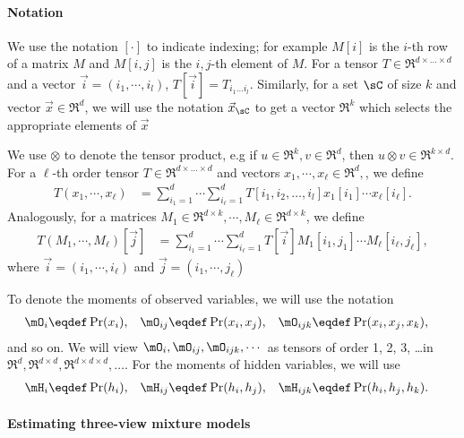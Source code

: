 \paragraph{Notation}

We use the notation $[\cdot]$ to indicate indexing; for example $M[i]$
  is the $i$-th row of a matrix $M$ and $M[i,j]$ is the $i,j$-th element
  of $M$.
For a tensor $T \in \Re^{d \times \ldots \times d}$ and a vector $\vec
  i = (i_1, \cdots, i_l)$, $T[\vec i] = T_{i_1 \ldots i_l}$.
Similarly, for a set $\sC$ of size $k$ and vector $\vec x \in \Re^d$, we
  will use the notation $\vec x_\sC$ to get a vector $\Re^k$ which selects
  the appropriate elements of $\vec x$

We use $\otimes$ to denote the tensor product, e.g if $u \in \Re^k,
  v \in \Re^d$, then $u \otimes v \in \Re^{k \times d}$.
For a $\ell$-th order tensor $T \in \Re^{d \times \ldots \times
  d}$ and vectors $x_1, \cdots, x_\ell \in \Re^{d},$, we define 
\begin{align*}
  T(x_1, \cdots, x_\ell) 
      &= \sum_{i_1 = 1}^{d} \cdots \sum_{i_\ell = 1}^{d} 
            T[i_1, i_2, \ldots, i_l] x_1[i_1] \cdots x_\ell[i_\ell].
\end{align*}
Analogously, for a matrices $M_1 \in \Re^{d \times k}, \cdots,
  M_\ell \in \Re^{d \times k}$, we define
\begin{align*}
  T(M_1, \cdots, M_\ell)[\vec j]
      &= \sum_{i_1 = 1}^{d} \cdots \sum_{i_\ell = 1}^{d} 
            T[\vec i] {M_1}[i_1,j_1] \cdots M_\ell[i_\ell, j_\ell],
\end{align*}
where $\vec i = (i_1, \cdots, i_\ell)$ and $\vec j = (i_1, \cdots, j_\ell)$

To denote the moments of observed variables, we will use the notation
\begin{align*}
  \mO_i &\eqdef \Pr(x_i), &
  \mO_{ij} &\eqdef \Pr(x_i, x_j), &
  \mO_{ijk} &\eqdef \Pr(x_i, x_j, x_k),
\end{align*}
and so on.
We will view $\mO_i, \mO_{ij}, \mO_{ijk}, \cdots$ as tensors of
  order 1, 2, 3, \ldots in $\Re^d, \Re^{d\times d}, \Re^{d \times
  d \times d},\ldots$.
For the moments of hidden variables, we will use 
\begin{align*}
  \mH_i &\eqdef \Pr(h_i), &
  \mH_{ij} &\eqdef \Pr(h_i, h_j), &
  \mH_{ijk} &\eqdef \Pr(h_i, h_j, h_k).
\end{align*}


\paragraph{Estimating three-view mixture models}

